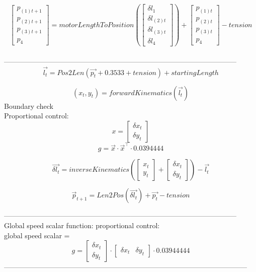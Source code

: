 \documentclass{article}
\begin{document}
\[
\begin{bmatrix}
p_{(1)t+1}\\
p_{(2)t+1}\\
p_{(3)t+1}\\
p_4
\end{bmatrix}
=
motorLengthToPosition \left(
\begin{bmatrix}
\delta{l_1}\\
\delta{l_{(2)t}}\\
\delta{l_{(3)t}}\\
\delta{l_4}
\end{bmatrix}
\right)
+ 
\begin{bmatrix}
p_{(1)t}\\
p_{(2)t}\\
p_{(3)t}\\
p_4
\end{bmatrix}
- tension
\]
\\---------------------------------------------------------------------------------------------------\\

\[
\vec{l_t} = Pos2Len
\left(
\vec{p_t} + 0.3533 + tension
\right) + startingLength
\]

\[
(x_t,y_t) = forwardKinematics \left(
\vec{l_t}
\right)
\]
Boundary check\\
Proportional control:\\
\[ x = 
\begin{bmatrix}
\delta{x_t}\\
\delta{y_t}
\end{bmatrix}
\]
\[
g = \vec{x} \cdot \vec{x}^\intercal \cdot 0.0394444
\]

\[
\vec{\delta{l_t}} = inverseKinematics \left(
\begin{bmatrix}
x_t\\
y_t
\end{bmatrix}
 + 
\begin{bmatrix}
\delta{x_t}\\
\delta{y_t}
\end{bmatrix}
\right)
- \vec{l_t}
\]


\[
\vec{p}_{t+1} = Len2Pos \left(
\vec{\delta{l_t}}
\right)
+ \vec{p_t} - tension
\]


---------------------------------------------------------------------------------------------------\\
Global speed scalar function:
proportional control:\\
global speed scalar = \[
g = 
\begin{bmatrix}
\delta{x_t}\\
\delta{y_t}
\end{bmatrix}
\cdot
\begin{bmatrix}
\delta{x_t} & \delta{y_t}
\end{bmatrix}
\cdot 
0.03944444
\]
--------------------------------------------------------------------------------------------------------\\
\end{document}
